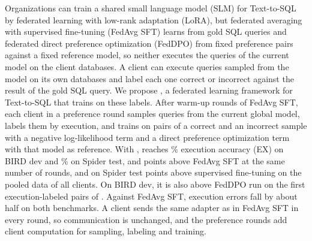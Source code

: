 Organizations can train a shared small language model (SLM) for Text-to-SQL by federated learning with low-rank adaptation (LoRA), but federated averaging with supervised fine-tuning (FedAvg SFT) learns from gold SQL queries and federated direct preference optimization (FedDPO) from fixed preference pairs against a fixed reference model, so neither executes the queries of the current model on the client databases. A client can execute queries sampled from the model on its own databases and label each one correct or incorrect against the result of the gold SQL query. We propose \method, a federated learning framework for Text-to-SQL that trains on these labels. After warm-up rounds of FedAvg SFT, each client in a preference round samples queries from the current global model, labels them by execution, and trains on pairs of a correct and an incorrect sample with a negative log-likelihood term and a direct preference optimization term with that model as reference. With , \method{} reaches \% execution accuracy (EX) on BIRD dev and \% on Spider test,  and  points above FedAvg SFT at the same number of rounds, and on Spider test  points above supervised fine-tuning on the pooled data of all clients. On BIRD dev, it is also above FedDPO run on the first execution-labeled pairs of \method. Against FedAvg SFT, execution errors fall by about half on both benchmarks. A client sends the same adapter as in FedAvg SFT in every round, so communication is unchanged, and the preference rounds add client computation for sampling, labeling and training.
